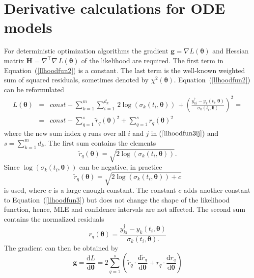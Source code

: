 \documentclass[12pt,a4paper]{scrartcl}
\newcommand{\DD}[2]{\frac{\mathrm{d} #1}{\mathrm{d} #2}}
\begin{document}
\section{Derivative calculations for ODE models} \label{sec:derivativies}
For deterministic optimization algorithms the gradient $\mathbf{g} = \nabla 
L(\boldsymbol{\theta})$ and Hessian matrix $\mathbf{H} = \nabla^\top\nabla\, 
L(\boldsymbol{\theta})$ of the likelihood are required. The first term in 
Equation~(\ref{llhoodfun2}) is a constant. The last term is the well-known weighted sum of 
squared residuals, sometimes denoted by $\chi^2(\boldsymbol{\theta})$. 
Equation~(\ref{llhoodfun2}) can be reformulated
\begin{eqnarray}
	L(\boldsymbol{\theta}) & = & const + \sum_{k=1}^m \sum_{i=1}^{d_k}\, 
2\log(\sigma_k(t_i, \boldsymbol{\theta}))\, +  \left(\frac{y_{ki}^\dagger - y_{k}(t_{i}, 
\boldsymbol{\theta})}{\sigma_k(t_i, \boldsymbol{\theta})}\right)^2 = \label{llhoodfun3ij} \\
	& = & const + \sum_{q=1}^{s} \tilde r_{q}(\boldsymbol{\theta})^2 + \sum_{q=1}^{s}  
r_{q}(\boldsymbol{\theta})^2 \label{llhoodfun3}
\end{eqnarray}
where the new sum index $q$ runs over all $i$ and $j$ in ($\ref{llhoodfun3ij}$) and $s = 
\sum_{k=1}^m d_k$. The first sum contains the elements 
\begin{equation}
	\tilde r_{q}(\boldsymbol{\theta}) = \sqrt{2\log(\sigma_k(t_i, \boldsymbol{\theta}))}. 
\label{rl1}
\end{equation}	
Since $\log(\sigma_k(t_i, \boldsymbol{\theta}))$ can be negative, in practice 
\begin{equation}
	\tilde r_{q}(\boldsymbol{\theta}) = \sqrt{2\log(\sigma_k(t_i, \boldsymbol{\theta})) + c} 
\label{rl2}
\end{equation}
is used, where $c$ is a large enough constant. The constant $c$ adds another constant to 
Equation~(\ref{llhoodfun3}) but does not change the shape of the likelihood function, 
hence, MLE and confidence intervals are not affected. The second sum contains the 
normalized residuals 
\begin{equation}
	r_{q}(\boldsymbol{\theta}) = \frac{y_{ki}^\dagger - y_{k}(t_{i}, \boldsymbol{\theta})}
{\sigma_k(t_i, \boldsymbol{\theta}).}  \label{rl3}
\end{equation}
The gradient can then be obtained by
\begin{equation}
	\mathbf{g} = \DD{L}{\boldsymbol{\theta}} = 2 \sum_{q=1}^{s} \left( {\tilde r}_{q} \cdot 
\DD{{\tilde r}_{q}}{\boldsymbol{\theta}} + {r}_{q} \cdot \DD{{r}_{q}}{\boldsymbol{\theta}} 
\right)
\end{equation}
\end{document}
